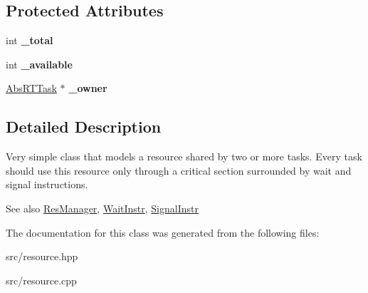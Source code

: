 \subsection*{Protected Attributes}
\begin{DoxyCompactItemize}
\item 
int {\bfseries \+\_\+total}\hypertarget{classRTSim_1_1Resource_ae5514797d40b8f2cd0a2cf0acd67d06c}{}\label{classRTSim_1_1Resource_ae5514797d40b8f2cd0a2cf0acd67d06c}

\item 
int {\bfseries \+\_\+available}\hypertarget{classRTSim_1_1Resource_a825ed23b84ac619d48d08f252695f1eb}{}\label{classRTSim_1_1Resource_a825ed23b84ac619d48d08f252695f1eb}

\item 
\hyperlink{classRTSim_1_1AbsRTTask}{Abs\+R\+T\+Task} $\ast$ {\bfseries \+\_\+owner}\hypertarget{classRTSim_1_1Resource_a247736232a741e0c430e304a45779eab}{}\label{classRTSim_1_1Resource_a247736232a741e0c430e304a45779eab}

\end{DoxyCompactItemize}


\subsection{Detailed Description}
Very simple class that models a resource shared by two or more tasks. Every task should use this resource only through a critical section surrounded by wait and signal instructions.

\begin{DoxySeeAlso}{See also}
\hyperlink{classRTSim_1_1ResManager}{Res\+Manager}, \hyperlink{classRTSim_1_1WaitInstr}{Wait\+Instr}, \hyperlink{classRTSim_1_1SignalInstr}{Signal\+Instr} 
\end{DoxySeeAlso}


The documentation for this class was generated from the following files\+:\begin{DoxyCompactItemize}
\item 
src/resource.\+hpp\item 
src/resource.\+cpp\end{DoxyCompactItemize}
